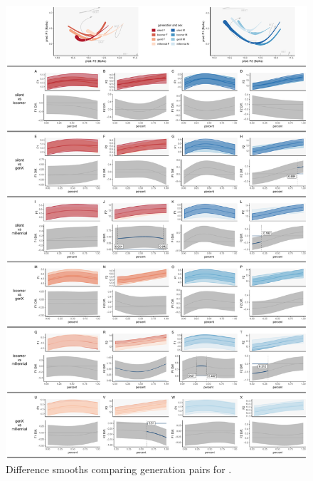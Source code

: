\begin{figure}[p]
    \centering
    \includegraphics[width=\textwidth]{Figures/BING/BING_detailed_generation_panel_plot.pdf}
    \caption{Difference smooths comparing generation pairs for \bing.}
    \label{fig:bing_diff_smooths_gen}
\end{figure}

